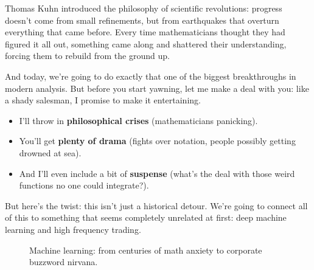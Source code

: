 Thomas Kuhn introduced the philosophy of scientific revolutions: progress doesn’t come from small refinements, but from earthquakes that overturn everything that came before. Every time mathematicians thought they had figured it all out, something came along and shattered their understanding, forcing them to rebuild from the ground up.

And today, we’re going to do exactly that one of the biggest breakthroughs in modern analysis. But before you start yawning, let me make a deal with you: like a shady salesman, I promise to make it entertaining.

\begin{itemize}
    \item I’ll throw in \textbf{philosophical crises} (mathematicians panicking).
    \item You’ll get \textbf{plenty of drama} (fights over notation, people possibly getting drowned at sea).
    \item And I’ll even include a bit of \textbf{suspense} (what’s the deal with those weird functions no one could integrate?).
\end{itemize}

But here’s the twist: this isn't just a historical detour. We’re going to connect all of this to something that seems completely unrelated at first: deep machine learning and high frequency trading.  

\begin{figure}[H]
\centering
{}
\caption{Machine learning: from centuries of math anxiety to corporate buzzword nirvana.}
\end{figure}


